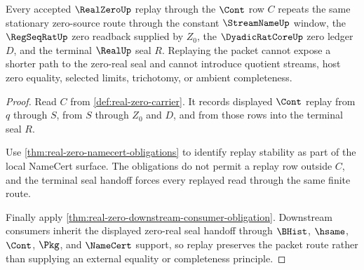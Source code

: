 \begin{theorem}
\label{thm:real-zero-replay-stability}
Every accepted $\RealZeroUp$ replay through the $\Cont$ row $C$ repeats the same stationary zero-source route through the constant $\StreamNameUp$ window, the $\RegSeqRatUp$ zero readback supplied by $Z_0$, the $\DyadicRatCoreUp$ zero ledger $D$, and the terminal $\RealUp$ seal $R$. Replaying the packet cannot expose a shorter path to the zero-real seal and cannot introduce quotient streams, host zero equality, selected limits, trichotomy, or ambient completeness.
\end{theorem}
\begin{proof}
Read $C$ from \autoref{def:real-zero-carrier}. It records displayed $\Cont$ replay from $q$ through $S$, from $S$ through $Z_0$ and $D$, and from those rows into the terminal seal $R$.

Use \autoref{thm:real-zero-namecert-obligations} to identify replay stability as part of the local NameCert surface. The obligations do not permit a replay row outside $C$, and the terminal seal handoff forces every replayed read through the same finite route.

Finally apply \autoref{thm:real-zero-downstream-consumer-obligation}. Downstream consumers inherit the displayed zero-real seal handoff through $\BHist$, $\hsame$, $\Cont$, $\Pkg$, and $\NameCert$ support, so replay preserves the packet route rather than supplying an external equality or completeness principle.
\end{proof}

